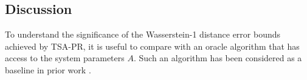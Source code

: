 






\subsection{Discussion}
To understand the significance of the Wasserstein-1 distance error bounds achieved by TSA-PR, it is useful to compare with an oracle algorithm that has access to the system parameters $A$.
Such an algorithm has been considered as a baseline in prior work \citep{polyakJuditsky,konda2004convergence,mokkadem2006convergence}.



